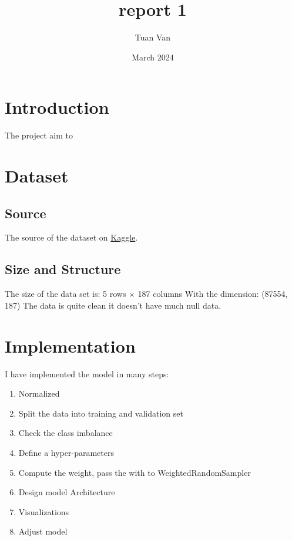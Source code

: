 \documentclass{article}
\title{report 1}
\author{Tuan Van}
\date{March 2024}
\begin{document}
\maketitle

\section{Introduction}
The project aim to 

\section{Dataset}
\subsection{Source}
The source of the dataset on \href{https://www.kaggle.com/datasets/shayanfazeli/heartbeat}{Kaggle}.
\subsection{Size and Structure}
The size of the data set is:
5 rows × 187 columns
With the dimension:
(87554, 187)
The data is quite clean it doesn't have much null data.
\section{Implementation}
I have implemented the model in many steps:
\begin{enumerate}
\item Normalized
\item Split the data into training and validation set
\item Check the class imbalance
\item Define a hyper-parameters
\item Compute the weight, pass the with to WeightedRandomSampler
\item Design model Architecture
\item Visualizations
\item Adjust model
\end{enumerate}
\end{document}
